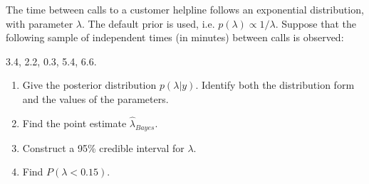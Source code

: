   \item The time between calls to a customer helpline follows an exponential distribution, with parameter $\lambda$. The default prior is used, i.e. $p(\lambda) \propto 1/ \lambda$.  Suppose that the following sample of independent times (in minutes) between calls is observed:
    
3.4, 2.2, 0.3, 5.4, 6.6. 
    
    \begin{enumerate}	 
      \item Give the posterior distribution  $p(\lambda | y)$. Identify both the distribution form and the values of the parameters. 
      \item Find the point estimate $\hat{\lambda}_{Bayes}$. 
      \item Construct a 95\% credible interval for $\lambda$. 
      \item Find $P(\lambda<0.15)$.
\end{enumerate}
     
